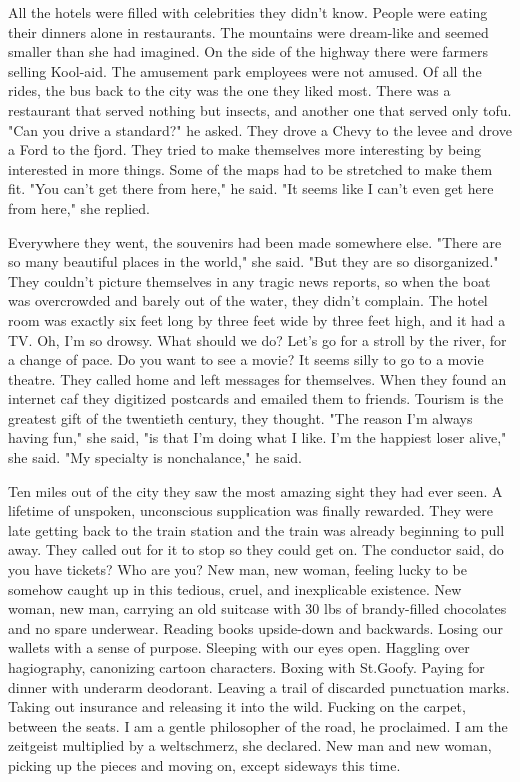 \documentclass[
]{memoir}
\begin{document}
All the hotels were filled with celebrities they didn't know. People
were eating their dinners alone in restaurants. The mountains were
dream-like and seemed smaller than she had imagined. On the side of the
highway there were farmers selling Kool-aid. The amusement park
employees were not amused. Of all the rides, the bus back to the city
was the one they liked most. There was a restaurant that served nothing
but insects, and another one that served only tofu. "Can you drive a
standard?" he asked. They drove a Chevy to the levee and drove a Ford to
the fjord. They tried to make themselves more interesting by being
interested in more things. Some of the maps had to be stretched to make
them fit. "You can't get there from here," he said. "It seems like I
can't even get here from here," she replied.

Everywhere they went, the souvenirs had been made somewhere else. "There
are so many beautiful places in the world," she said. "But they are so
disorganized." They couldn't picture themselves in any tragic news
reports, so when the boat was overcrowded and barely out of the water,
they didn't complain. The hotel room was exactly six feet long by three
feet wide by three feet high, and it had a TV. Oh, I'm so drowsy. What
should we do? Let's go for a stroll by the river, for a change of pace.
Do you want to see a movie? It seems silly to go to a movie theatre.
They called home and left messages for themselves. When they found an
internet caf they digitized postcards and emailed them to friends.
Tourism is the greatest gift of the twentieth century, they thought.
"The reason I'm always having fun," she said, "is that I'm doing what I
like. I'm the happiest loser alive," she said. "My specialty is
nonchalance," he said.

Ten miles out of the city they saw the most amazing sight they had ever
seen. A lifetime of unspoken, unconscious supplication was finally
rewarded. They were late getting back to the train station and the train
was already beginning to pull away. They called out for it to stop so
they could get on. The conductor said, do you have tickets? Who are you?
New man, new woman, feeling lucky to be somehow caught up in this
tedious, cruel, and inexplicable existence. New woman, new man, carrying
an old suitcase with 30 lbs of brandy-filled chocolates and no spare
underwear. Reading books upside-down and backwards. Losing our wallets
with a sense of purpose. Sleeping with our eyes open. Haggling over
hagiography, canonizing cartoon characters. Boxing with St.Goofy. Paying
for dinner with underarm deodorant. Leaving a trail of discarded
punctuation marks. Taking out insurance and releasing it into the wild.
Fucking on the carpet, between the seats. I am a gentle philosopher of
the road, he proclaimed. I am the zeitgeist multiplied by a weltschmerz,
she declared. New man and new woman, picking up the pieces and moving
on, except sideways this time.
\end{document}
